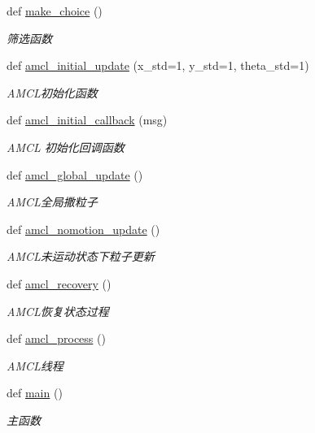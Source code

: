 \begin{DoxyCompactItemize}
def \hyperlink{namespaceselect___a_a39d0d3e4508cfd900be3ec4ec2331ec2}{make\+\_\+choice} ()
\begin{DoxyCompactList}\small\item\em 筛选函数 \end{DoxyCompactList}\item 
def \hyperlink{namespaceselect___a_a8507768cdd24e701a92094da46d8ada7}{amcl\+\_\+initial\+\_\+update} (x\+\_\+std=1, y\+\_\+std=1, theta\+\_\+std=1)
\begin{DoxyCompactList}\small\item\em A\+M\+C\+L初始化函数 \end{DoxyCompactList}\item 
def \hyperlink{namespaceselect___a_a26c50d8845db40526c13f427bf0889ef}{amcl\+\_\+initial\+\_\+callback} (msg)
\begin{DoxyCompactList}\small\item\em A\+M\+CL 初始化回调函数 \end{DoxyCompactList}\item 
def \hyperlink{namespaceselect___a_a375138794460ec68c792c8cddb7870e4}{amcl\+\_\+global\+\_\+update} ()
\begin{DoxyCompactList}\small\item\em A\+M\+C\+L全局撒粒子 \end{DoxyCompactList}\item 
def \hyperlink{namespaceselect___a_a28ec20b3507422ab6de55b3d22c54c13}{amcl\+\_\+nomotion\+\_\+update} ()
\begin{DoxyCompactList}\small\item\em A\+M\+C\+L未运动状态下粒子更新 \end{DoxyCompactList}\item 
def \hyperlink{namespaceselect___a_a45210262734cf777b4d1df68bce66838}{amcl\+\_\+recovery} ()
\begin{DoxyCompactList}\small\item\em A\+M\+C\+L恢复状态过程 \end{DoxyCompactList}\item 
def \hyperlink{namespaceselect___a_a97410aa944db08a7803c0395c7c1171c}{amcl\+\_\+process} ()
\begin{DoxyCompactList}\small\item\em A\+M\+C\+L线程 \end{DoxyCompactList}\item 
def \hyperlink{namespaceselect___a_a6a3edd4d647a13591de5722d5232d1bb}{main} ()
\begin{DoxyCompactList}\small\item\em 主函数 \end{DoxyCompactList}\end{DoxyCompactItemize}
